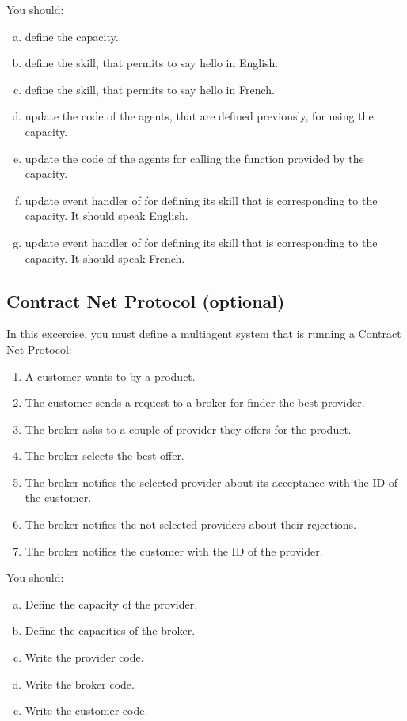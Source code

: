 \documentclass[article,english,nodocumentinfo]{utbmciadreport}
\begin{document}
You should:
\begin{enumerate}[a)]
\item define the  capacity.
\item define the  skill, that permits to say hello in English.
\item define the  skill, that permits to say hello in French.
\item update the code of the agents, that are defined previously, for using the  capacity.
\item update the code of the agents for calling the function provided by the  capacity.
\item update  event handler of  for defining its skill that is corresponding to the  capacity. It should speak English.
\item update  event handler of  for defining its skill that is corresponding to the  capacity. It should speak French.
\end{enumerate}

\subsection{Contract Net Protocol (optional)}

In this excercise, you must define a multiagent system that is running a Contract Net Protocol:
\begin{enumerate}
\item A customer wants to by a product.
\item The customer sends a request to a broker for finder the best provider.
\item The broker asks to a couple of provider they offers for the product.
\item The broker selects the best offer.
\item The broker notifies the selected provider about its acceptance with the ID of the customer.
\item The broker notifies the not selected providers about their rejections.
\item The broker notifies the customer with the ID of the provider.
\end{enumerate}

You should:
\begin{enumerate}[a)]
\item Define the capacity of the provider.
\item Define the capacities of the broker.
\item Write the provider code.
\item Write the broker code.
\item Write the customer code.
\end{enumerate}
\end{document}
